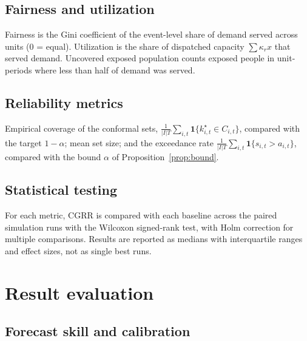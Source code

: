 \documentclass[pdflatex,sn-basic]{sn-jnl}
\theoremstyle{plain}%
\theoremstyle{remark}%
\theoremstyle{definition}%
\begin{document}
\subsection{Fairness and utilization}

Fairness is the Gini coefficient of the event-level share of demand served across units (0 = equal). Utilization is the share of dispatched capacity $\sum \kappa_r x$ that served demand. Uncovered exposed population counts exposed people in unit-periods where less than half of demand was served.

\subsection{Reliability metrics}
 Empirical coverage of the conformal sets, $\frac{1}{|I|T}\sum_{i,t}\mathbf{1}\{k^\star_{i,t} \in C_{i,t}\}$, compared with the target $1-\alpha$; mean set size; and the exceedance rate $\frac{1}{|I|T}\sum_{i,t}\mathbf{1}\{s_{i,t} > a_{i,t}\}$, compared with the bound $\alpha$ of Proposition~\ref{prop:bound}.

\subsection{Statistical testing}
 For each metric, CGRR is compared with each baseline across the paired simulation runs with the Wilcoxon signed-rank test, with Holm correction for multiple comparisons. Results are reported as medians with interquartile ranges and effect sizes, not as single best runs.

\section{Result evaluation}\label{sec:results}

\subsection{Forecast skill and calibration}
\end{document}
